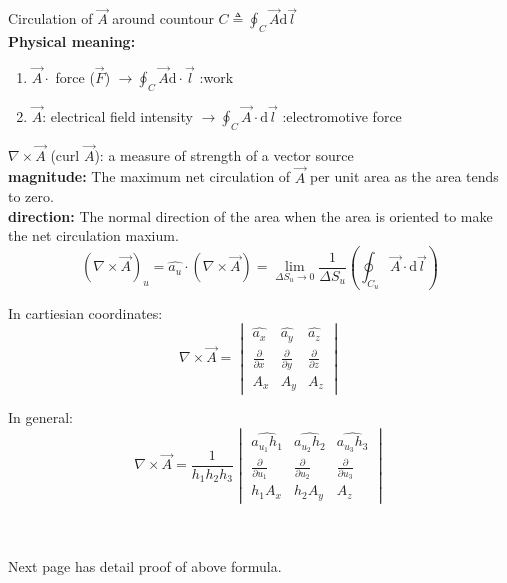 \documentclass[12pt, a4paper]{article}
\begin{document}
Circulation of $\vec{A}$ around countour $C \triangleq \oint_C \vec{A} \text{d} \vec{l}$ \\

\textbf{Physical meaning:}

\begin{enumerate}[label=\textcircled{\arabic*}]
	\item $\vec{A} \cdot$ force ($\vec{F}$) $\to \oint_C \vec{A} \text{d} \cdot \vec{l}$ :\quad  work
	
	\item $\vec{A}$: electrical field intensity $\to \oint_C \vec{A} \cdot \text{d} \vec{l}$ :\quad electromotive force
\end{enumerate}

$\nabla \times \vec{A}$ (curl $\vec{A}$): a measure of strength of a vector source \\ 

\textbf{magnitude:} The maximum net circulation of $\vec{A}$ per unit area as the area tends to zero. \\
\textbf{direction:} The normal direction of the area when the area is oriented to make the net circulation maxium. \\ 

$$
(\nabla \times \vec{A})_u = \hat{a_u} \cdot (\nabla \times \vec{A}) = \lim_{\Delta S_u \to 0} \frac{1}{\Delta S_u} (\oint_{C_u} \vec {A} \cdot \text{d} \vec{l})
$$

\begin{minipage}[t]{0.5 \textwidth}
	In cartiesian coordinates:
	$$
  \nabla \times \vec{A} = \begin{vmatrix}
		\hat{a_x} & \hat{a_y} & \hat{a_z} \\
		\frac{\partial}{\partial x} & \frac{\partial}{\partial y} & \frac{\partial}{\partial z} \\ 
		A_x & A_y & A_z
	\end{vmatrix}
	$$
\end{minipage}
\hfill
\begin{minipage}[t]{0.5 \textwidth}
	In general:
	$$
  \nabla \times \vec{A} = \frac{1}{h_1 h_2 h_3} \begin{vmatrix}
		\hat{a_{u_1} h_1} & \hat{a_{u_2} h_2} & \hat{a_{u_3} h_3} \\
		\frac{\partial}{\partial u_1} & \frac{\partial}{\partial u_2} & \frac{\partial}{\partial u_3} \\ 
		h_1 A_x & h_2 A_y & A_z
	\end{vmatrix}
	$$
\end{minipage}
\\ \\
Next page has detail proof of above formula.
\newpage
\end{document}

